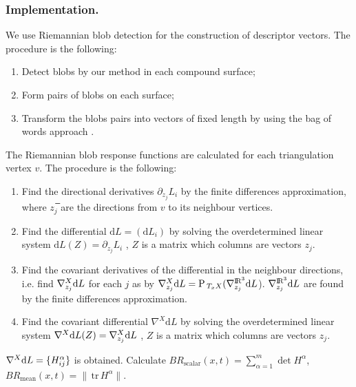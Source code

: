 \documentclass{llncs}
\newcommand{\Proj}{\mathrm{P}{\,}}
\newcommand{\partderiv}[2]{\partial_{#2} {#1}}
\newcommand{\CovariantDiffManif}[1]{\nabla^{#1}}
\newcommand{\CovariantDerivManif}[2]{\tensor*{\nabla}{^{#1}_{#2}}}
\newcommand{\Diff}{\mathrm{d}}
\newcommand{\FRScalar}{BR_{\mathrm{scalar}}}
\newcommand{\FRMean}{BR_{\mathrm{mean}}}
\newcommand {\tr}{{\,}\mathrm{tr}{\,}}
\begin{document}
\subsubsection{Implementation.}
We use Riemannian blob detection for the construction of descriptor vectors. The procedure is the following:
\begin{enumerate} 
\item Detect blobs by our method in each compound surface;
\item	Form pairs of blobs on each surface;
\item Transform the blobs pairs into vectors of fixed length by using the bag of words approach \cite{bag}.
\end{enumerate}
The Riemannian blob response functions are calculated for each triangulation vertex $v$. The procedure is the following:
\begin{enumerate} 
	\item Find the directional derivatives $\partderiv{L_i}{z_j}$ by the finite differences approximation, where $z_j$̅ are the directions from $v$ to its neighbour vertices. 
	\item Find the differential $\Diff L=(\Diff L_i)$ by solving the overdetermined linear system $\Diff L(Z)=\partderiv{L_i}{z_j}$ , $Z$  is a matrix which columns are vectors $z_j$.
	\item Find the covariant derivatives of the differential in the neighbour directions, i.e. find $\CovariantDerivManif{X}{z_j} \Diff L$ for each $j$ as by $\CovariantDerivManif{X}{z_j} \Diff L =\Proj_{T_xX} ( \CovariantDerivManif{\bbbr^3}{z_j} \Diff L$). $\CovariantDerivManif{\bbbr^3}{z_j} \Diff L$ are found by the finite differences approximation.
	\item Find the covariant differential $\CovariantDiffManif{X} \Diff L$ by solving the overdetermined linear system 
	$\CovariantDiffManif{X} \Diff L(Z)=\CovariantDerivManif{X}{z_j} \Diff L$ , $Z$  is a matrix which columns are vectors $z_j$.
	\end{enumerate}
	$\CovariantDiffManif{X} \Diff L=\{\tensor*{H}{_i_j^\alpha} \}$ is obtained. Calculate $\FRScalar(x,t)=\sum_{\alpha=1}^{m}\det H^{\alpha}$,
	\\
	$\FRMean(x,t)=\|\tr H^{\alpha}\|$.	
\end{document}
